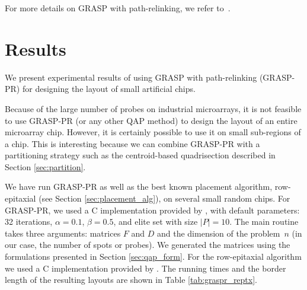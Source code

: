 \documentclass{bioinfo}
\begin{document}
For more details on GRASP with path-relinking, we refer to~\citep{OLIVEIRA04}.

\section{Results}
\label{sec:results}

We present experimental results of using GRASP with path-relinking (GRASP-PR) for designing the layout of small artificial chips.

Because of the large number of probes on industrial microarrays, it is not
feasible to use GRASP-PR (or any other QAP method) to design the layout of an
entire microarray chip. However, it is certainly possible to use it on small
sub-regions of a chip. This is interesting because we can combine GRASP-PR
with a partitioning strategy such as the centroid-based quadrisection
described in Section \ref{sec:partition}.

We have run GRASP-PR as well as the best known placement algorithm,
row-epitaxial (see Section \ref{sec:placement_alg}), on several small random
chips. For GRASP-PR, we used a C implementation provided by
\citet{OLIVEIRA04}, with default parameters: 32 iterations, $\alpha=0.1$,
$\beta=0.5$, and elite set with size $|P|=10$. The main routine takes
three arguments: matrices $F$ and $D$ and the dimension of the problem~$n$ (in
our case, the number of spots or probes). We generated the matrices using the
formulations presented in Section \ref{sec:qap_form}. For the row-epitaxial
algorithm we used a C implementation provided by \citet{KAHNG03A}. The
running times and the border length of the resulting layouts are shown in
Table \ref{tab:graspr_reptx}.
\end{document}
